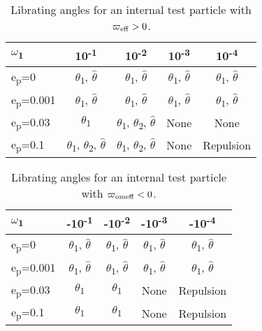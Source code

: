 \documentclass[11pt]{article}
\begin{document}
\begin{table}[htbp]
\caption{Librating angles for an internal test particle with \(\varpi_{\rm eff}>0\).}
\centering
\begin{tabular}{| l | c | c | c | c |}
\hline
\(\omega\)\textsubscript{1} & 10\textsuperscript{-1} & 10\textsuperscript{-2} & 10\textsuperscript{-3} & 10\textsuperscript{-4}\\
\hline
e\textsubscript{p}=0 & \(\theta\)\textsubscript{1}, \(\hat\theta\) & \(\theta\)\textsubscript{1}, \(\hat\theta\) & \(\theta\)\textsubscript{1}, \(\hat\theta\) & \(\theta\)\textsubscript{1}, \(\hat\theta\)\\
\hline
e\textsubscript{p}=0.001 & \(\theta\)\textsubscript{1}, \(\hat\theta\) & \(\theta\)\textsubscript{1}, \(\hat\theta\) & \(\theta\)\textsubscript{1}, \(\hat\theta\) & \(\theta\)\textsubscript{1}, \(\hat\theta\)\\
\hline
e\textsubscript{p}=0.03 & \(\theta\)\textsubscript{1} & \(\theta\)\textsubscript{1}, \(\theta\)\textsubscript{2}, \(\hat\theta\) & None & None\\
\hline
e\textsubscript{p}=0.1 & \(\theta\)\textsubscript{1}, \(\theta\)\textsubscript{2}, \(\hat\theta\) & \(\theta\)\textsubscript{1}, \(\theta\)\textsubscript{2}, \(\hat\theta\) & None & Repulsion\\
\hline
\end{tabular}
\end{table}

\begin{table}[htbp]
\caption{Librating angles for an internal test particle with \(\varpi_{\rm omeff}<0\).}
\centering
\begin{tabular}{| l | c | c | c | c |}
\hline
\(\omega\)\textsubscript{1} & -10\textsuperscript{-1} & -10\textsuperscript{-2} & -10\textsuperscript{-3} & -10\textsuperscript{-4}\\
\hline
e\textsubscript{p}=0 & \(\theta\)\textsubscript{1}, \(\hat\theta\) & \(\theta\)\textsubscript{1}, \(\hat\theta\) & \(\theta\)\textsubscript{1}, \(\hat\theta\) & \(\theta\)\textsubscript{1}, \(\hat\theta\)\\
\hline
e\textsubscript{p}=0.001 & \(\theta\)\textsubscript{1}, \(\hat\theta\) & \(\theta\)\textsubscript{1}, \(\hat\theta\) & \(\theta\)\textsubscript{1}, \(\hat\theta\) & \(\theta\)\textsubscript{1}, \(\hat\theta\)\\
\hline
e\textsubscript{p}=0.03 & \(\theta\)\textsubscript{1} & \(\theta\)\textsubscript{1} & None & Repulsion\\
\hline
e\textsubscript{p}=0.1 & \(\theta\)\textsubscript{1} & \(\theta\)\textsubscript{1} & None & Repulsion\\
\hline
\end{tabular}
\end{table}
\end{document}
